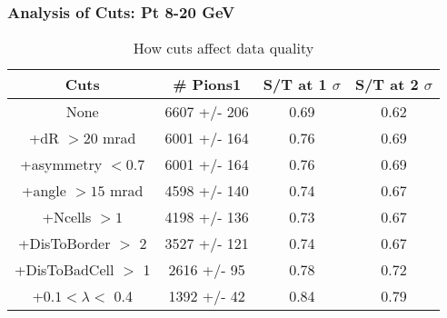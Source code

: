 \frame
{
\frametitle{Analysis of Cuts: Pt 8-20 GeV}
\begin{table}
\caption{How cuts affect data quality}
\centering
\begin{tabular}{c c c c}
\hline\hline
Cuts & \# Pions1 & S/T at 1 $\sigma$ & S/T at 2 $\sigma$ \\ [0.5ex]
\hline
None & 6607 +/-  206 & 0.69 & 0.62 \\ %
+dR $> 20$ mrad & 6001 +/-  164 & 0.76 & 0.69 \\ %
+asymmetry $< 0.7$ & 6001 +/-  164 & 0.76 & 0.69 \\ %
+angle $> 15$ mrad & 4598 +/-  140 & 0.74 & 0.67 \\ %
+Ncells $> 1$& 4198 +/-  136 & 0.73 & 0.67 \\ %
+DisToBorder $>$ 2 & 3527 +/-  121 & 0.74 & 0.67 \\ %
+DisToBadCell $>$ 1& 2616 +/-   95 & 0.78 & 0.72 \\ %
+$0.1 < \lambda <$ 0.4 & 1392 +/-   42 & 0.84 & 0.79 \\ %
[1ex]
\hline
\end{tabular}
\label{table:nonlin}
\end{table}
}
